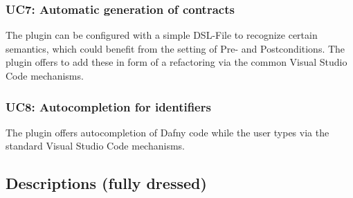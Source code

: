 \subsubsection{UC7: Automatic generation of contracts}
The plugin can be configured with a simple DSL-File to recognize certain semantics, which could benefit from the setting of Pre- and Postconditions. The plugin offers to add these in form of a refactoring via the common Visual Studio Code mechanisms.
\subsubsection{UC8: Autocompletion for identifiers}
The plugin offers autocompletion of Dafny code while the user types via the standard Visual Studio Code mechanisms.
\subsection{Descriptions (fully dressed)}
